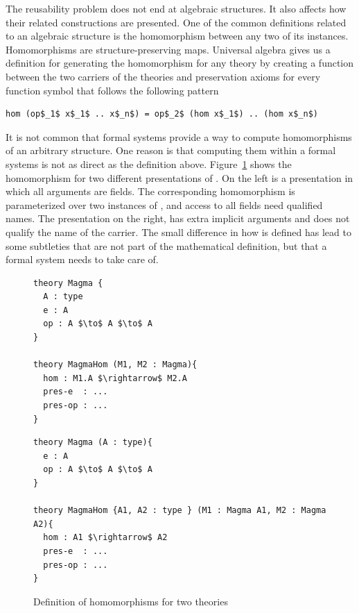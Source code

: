 The reusability problem does not end at algebraic structures. It also affects how their related constructions are presented. One of the common definitions related to an algebraic structure is the homomorphism between any two of its instances. Homomorphisms are structure-preserving maps. Universal algebra gives us a definition for generating the homomorphism for any theory  by creating a function between the two carriers of the theories and preservation axioms for every function symbol  that follows the following pattern 
\begin{lstlisting}[mathescape]
hom (op$_1$ x$_1$ .. x$_n$) = op$_2$ (hom x$_1$) .. (hom x$_n$)
\end{lstlisting}
It is not common that formal systems provide a way to compute homomorphisms of an arbitrary structure. One reason is that computing them within a formal systems is not as direct as the definition above. Figure~\ref{fig:Xhom} shows the  homomorphism for two different presentations of . On the left is a presentation in which all arguments are fields. The corresponding homomorphism is parameterized over two instances of , and access to all fields need qualified names. The presentation on the right, has extra implicit arguments and does not qualify the name of the carrier. The small difference in how  is defined has lead to some subtleties that are not part of the mathematical definition, but that a formal system needs to take care of. 
\begin{figure}
    \begin{multicols}{2}
        \begin{lstlisting}[mathescape]
theory Magma { 
  A : type 
  e : A
  op : A $\to$ A $\to$ A
}
        
theory MagmaHom (M1, M2 : Magma){
  hom : M1.A $\rightarrow$ M2.A
  pres-e  : ... 
  pres-op : ... 
}
     \end{lstlisting}        
        \columnbreak
        \begin{lstlisting}[mathescape]
theory Magma (A : type){  
  e : A
  op : A $\to$ A $\to$ A
}

theory MagmaHom {A1, A2 : type } (M1 : Magma A1, M2 : Magma A2){
  hom : A1 $\rightarrow$ A2
  pres-e  : ... 
  pres-op : ... 
}
        \end{lstlisting}
    \end{multicols}    
    \caption{Definition of homomorphisms for two theories}
    \label{fig:Xhom}
\end{figure}

